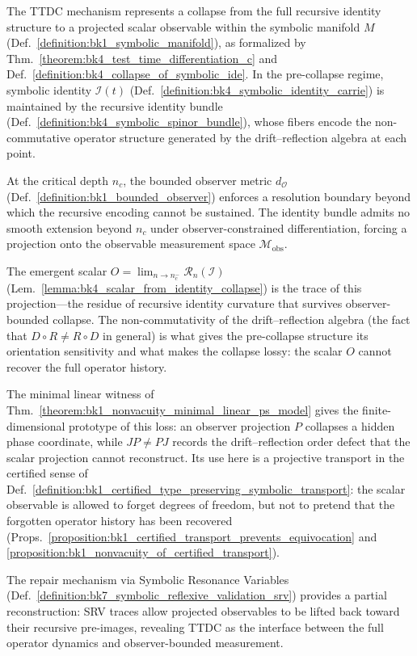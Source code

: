 \begin{scholium}
\label{scholium:bk4_ttdc_symbolic_singularity}
The TTDC mechanism represents a collapse from the full recursive identity structure to a projected scalar observable within the symbolic manifold $M$ (Def.~\ref{definition:bk1_symbolic_manifold}), as formalized by Thm.~\ref{theorem:bk4_test_time_differentiation_c} and Def.~\ref{definition:bk4_collapse_of_symbolic_ide}. In the pre-collapse regime, symbolic identity $\mathcal{I}(t)$ (Def.~\ref{definition:bk4_symbolic_identity_carrie}) is maintained by the recursive identity bundle (Def.~\ref{definition:bk4_symbolic_spinor_bundle}), whose fibers encode the non-commutative operator structure generated by the drift--reflection algebra at each point.

At the critical depth $n_c$, the bounded observer metric $d_{\mathcal{O}}$ (Def.~\ref{definition:bk1_bounded_observer}) enforces a resolution boundary beyond which the recursive encoding cannot be sustained. The identity bundle admits no smooth extension beyond $n_c$ under observer-constrained differentiation, forcing a projection onto the observable measurement space $\mathcal{M}_{\text{obs}}$.

The emergent scalar $O = \lim_{n \to n_c^-} \mathcal{R}_n(\mathcal{I})$ (Lem.~\ref{lemma:bk4_scalar_from_identity_collapse}) is the trace of this projection---the residue of recursive identity curvature that survives observer-bounded collapse. The non-commutativity of the drift--reflection algebra (the fact that $D \circ R \neq R \circ D$ in general) is what gives the pre-collapse structure its orientation sensitivity and what makes the collapse lossy: the scalar $O$ cannot recover the full operator history.

The minimal linear witness of Thm.~\ref{theorem:bk1_nonvacuity_minimal_linear_ps_model} gives the finite-dimensional prototype of this loss: an observer projection \(P\) collapses a hidden phase coordinate, while \(JP \ne PJ\) records the drift--reflection order defect that the scalar projection cannot reconstruct.  Its use here is a projective transport in the certified sense of Def.~\ref{definition:bk1_certified_type_preserving_symbolic_transport}: the scalar observable is allowed to forget degrees of freedom, but not to pretend that the forgotten operator history has been recovered (Props.~\ref{proposition:bk1_certified_transport_prevents_equivocation} and \ref{proposition:bk1_nonvacuity_of_certified_transport}).

The repair mechanism via Symbolic Resonance Variables (Def.~\ref{definition:bk7_symbolic_reflexive_validation_srv}) provides a partial reconstruction: SRV traces allow projected observables to be lifted back toward their recursive pre-images, revealing TTDC as the interface between the full operator dynamics and observer-bounded measurement.
\end{scholium}

